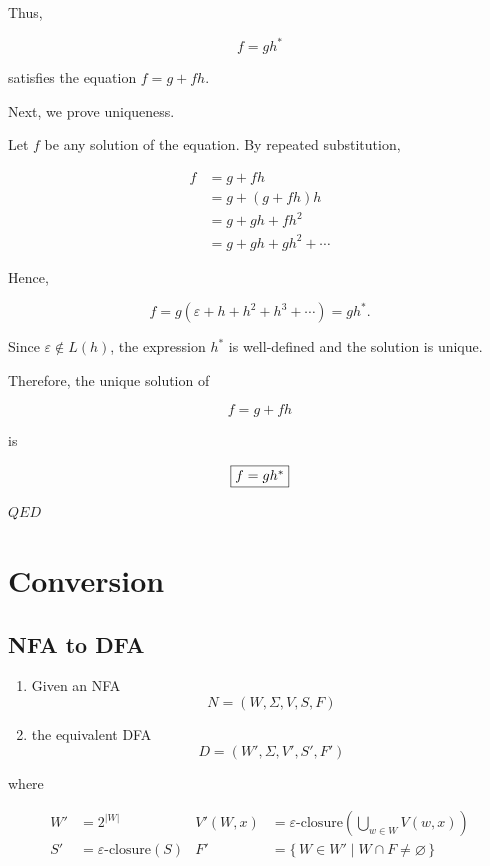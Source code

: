 \documentclass[12pt,a4paper,openany]{article}
\begin{document}
Thus,

\[
f = g h^*
\]

satisfies the equation $f = g + f h$.

Next, we prove uniqueness.

Let $f$ be any solution of the equation. By repeated substitution,

\[
\begin{aligned}
f &= g + f h \\
  &= g + (g + f h)h \\
  &= g + g h + f h^2 \\
  &= g + g h + g h^2 + \cdots
\end{aligned}
\]

Hence,

\[
f = g(\varepsilon + h + h^2 + h^3 + \cdots) = g h^*.
\]

Since $\varepsilon \notin L(h)$, the expression $h^*$ is well-defined and the solution is unique.

Therefore, the unique solution of

\[
f = g + f h
\]

is


\[
\fbox{$f = g h^*$}
\]



\hfill $QED$

\section{Conversion}

\subsection{NFA to DFA }

\begin{enumerate}
    \item Given an NFA  
    \[
    N = (W, \Sigma, V, S, F)
    \]
    \item the equivalent DFA  
    \[
    D = (W', \Sigma, V', S', F')
    \]
\end{enumerate}

where 

\[
\begin{aligned}
W' &= 2^{|W|} & V'(W, x) &= \varepsilon\text{-closure}\left(\bigcup_{w \in W} V(w, x)\right) \\
S' &= \varepsilon\text{-closure}(S) & F' &= \{\, W \in W' \mid W \cap F \neq \varnothing \,\}
\end{aligned}
\]
\end{document}

